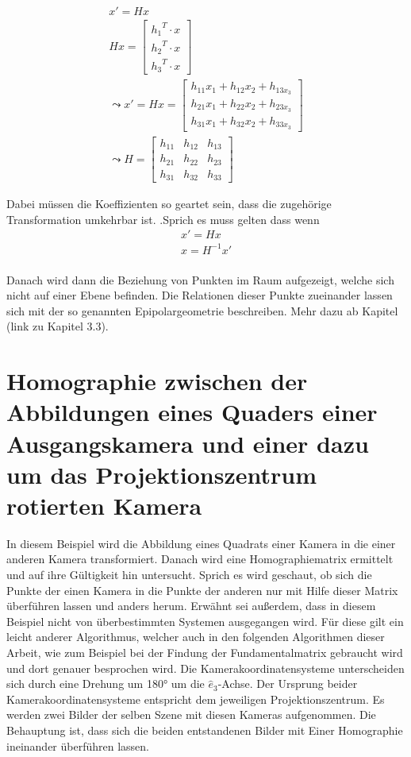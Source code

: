 \begin{gather}
	x' = Hx\\
	Hx = \begin{bmatrix}
	{h_1}^T \cdot x\\{h_2}^T \cdot x\\{h_3}^T \cdot x
	\end{bmatrix} \\
	\leadsto 
	x'= Hx= \begin{bmatrix}
	h_{11}x_1+h_{12}x_2+h_{13x_3}\\
	h_{21}x_1+h_{22}x_2+h_{23x_3}\\
	h_{31}x_1+h_{32}x_2+h_{33x_3}
	\end{bmatrix}\\
	\leadsto 
	H=\begin{bmatrix}
	h_{11}&h_{12}&h_{13}\\
	h_{21}&h_{22}&h_{23}\\
	h_{31}&h_{32}&h_{33}
	\end{bmatrix}
\end{gather}

Dabei müssen die Koeffizienten so geartet sein, dass die zugehörige Transformation umkehrbar ist. \cite{HZ}\cite{Peiffer}.Sprich es muss gelten dass wenn 
\begin{gather}
	x'=Hx\\
	x= H^{-1}x'
\end{gather}\\

Danach wird dann die Beziehung von Punkten im Raum aufgezeigt, welche sich nicht auf einer Ebene befinden. Die Relationen dieser Punkte zueinander lassen sich mit der so genannten Epipolargeometrie beschreiben. Mehr dazu ab Kapitel (link zu Kapitel 3.3).




\section{Homographie zwischen der Abbildungen eines Quaders einer Ausgangskamera und einer dazu um das Projektionszentrum rotierten Kamera }

In diesem Beispiel wird die Abbildung eines Quadrats einer Kamera in die einer anderen Kamera transformiert. Danach wird eine Homographiematrix ermittelt und auf ihre Gültigkeit hin untersucht. Sprich es wird geschaut, ob sich die Punkte der einen Kamera in die Punkte der anderen nur mit Hilfe dieser Matrix überführen lassen und anders herum. Erwähnt sei außerdem, dass in diesem Beispiel nicht von überbestimmten Systemen ausgegangen wird. Für diese gilt ein leicht anderer Algorithmus, welcher auch in den folgenden Algorithmen dieser Arbeit, wie zum Beispiel bei der Findung der Fundamentalmatrix gebraucht wird und dort genauer besprochen wird.
Die Kamerakoordinatensysteme unterscheiden sich durch eine Drehung um 180° um die \ensuremath{\hat{e}_3}-Achse. Der Ursprung beider Kamerakoordinatensysteme entspricht dem jeweiligen Projektionszentrum. Es werden zwei Bilder der selben Szene mit diesen Kameras aufgenommen. Die Behauptung ist, dass sich die beiden entstandenen Bilder mit Einer Homographie ineinander überführen lassen. 

